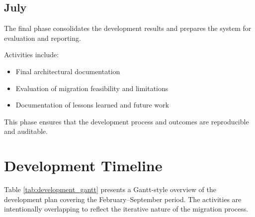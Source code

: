 \subsection*{July}

The final phase consolidates the development results and prepares the system
for evaluation and reporting.

Activities include:
\begin{itemize}
    \item Final architectural documentation
    \item Evaluation of migration feasibility and limitations
    \item Documentation of lessons learned and future work
\end{itemize}

This phase ensures that the development process and outcomes are reproducible
and auditable.

\section{Development Timeline}

Table \ref{tab:development_gantt} presents a Gantt-style overview of
the development plan covering the February--September period. The
activities are intentionally overlapping to reflect the iterative
nature of the migration process.

